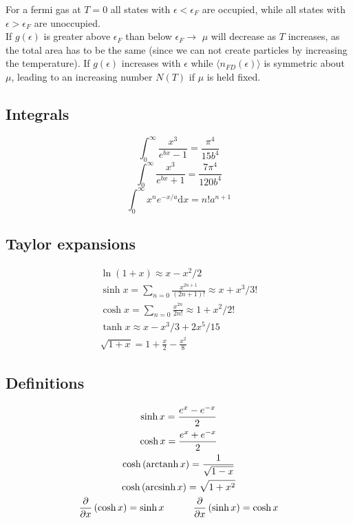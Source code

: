 \documentclass[a4paper, norsk, 8pt]{article}
\DeclareMathOperator{\arcsinh}{arcsinh}
\DeclareMathOperator{\arctanh}{arctanh}
\begin{document}
\begin{multicols*}{3}
For a fermi gas at $T=0$ all states with $\epsilon < \epsilon_F$ are occupied, while all states with $\epsilon > \epsilon_F$ are unoccupied.\\
If $g(\epsilon)$ is greater above $\epsilon_F$ than below $\epsilon_F \rightarrow$ $\mu$ will decrease as $T$ increases, as the total area has to be the same (since we can not create particles by increasing the temperature).
If $g(\epsilon)$ increases with $\epsilon$ while $\langle n_{FD}(\epsilon) \rangle$ is symmetric about $\mu$, leading to an increasing number $N(T)$ if $\mu$ is held fixed.

\subsection*{\footnotesize  Integrals}
$$ \int_0^{\infty} \frac{x^3}{e^{bx}-1} = \frac{\pi^4}{15b^4}$$
$$ \int_0^{\infty} \frac{x^3}{e^{bx}+1} = \frac{7\pi^4}{120b^4}$$
$$ \int_0^{\infty} x^n e^{-x/a} \mbox{d}x = n! a^{n+1}$$

\subsection*{\footnotesize  Taylor expansions}
\begin{gather*}
  \ln{(1+x)} \approx x - x^2/2 \\
  \sinh{x} = \sum_{n=0} \frac{x^{2n+1}}{(2n+1)!} \approx x + x^3/3!  \\
  \cosh{x} = \sum_{n=0} \frac{x^{2n}}{2n!}       \approx 1 + x^2/2!\\
  \tanh{x} \approx x-x^3/3 + 2x^5/15 \\
  \sqrt{1+x} = 1 + \frac{x}{2} - \frac{x^2}{8}
\end{gather*}

\subsection*{\footnotesize  Definitions}

\begin{gather*}
  \sinh{x} = \frac{e^{x}-e^{-x}}{2} \\
  \cosh{x} = \frac{e^{x}+e^{-x}}{2} \\
  \cosh{\left( \arctanh{x} \right)} = \frac{1}{\sqrt{1-x}} \\
  \cosh{\left( \arcsinh{x} \right)} = \sqrt{1+x^2} \\
  \pdv{}{x}\left( \cosh{x} \right) = \sinh{x} \quad\qquad \pdv{}{x}\left( \sinh{x} \right) = \cosh{x}
\end{gather*}


\end{multicols*}
\end{document}
